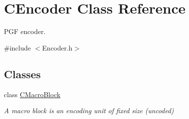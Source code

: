 \hypertarget{classCEncoder}{}\section{C\+Encoder Class Reference}
\label{classCEncoder}


P\+GF encoder.  




{\ttfamily \#include $<$Encoder.\+h$>$}

\subsection*{Classes}
\begin{DoxyCompactItemize}
\item 
class \mbox{\hyperlink{classCEncoder_1_1CMacroBlock}{C\+Macro\+Block}}
\begin{DoxyCompactList}\small\item\em A macro block is an encoding unit of fixed size (uncoded) \end{DoxyCompactList}\end{DoxyCompactItemize}
